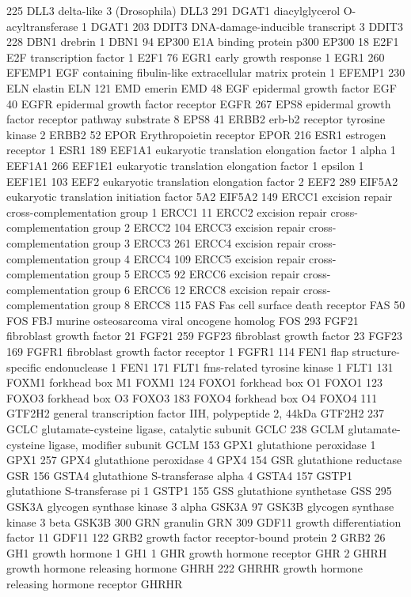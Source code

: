 225	DLL3	delta-like 3 (Drosophila)	DLL3
291	DGAT1	diacylglycerol O-acyltransferase 1	DGAT1
203	DDIT3	DNA-damage-inducible transcript 3	DDIT3
228	DBN1	drebrin 1	DBN1
94	EP300	E1A binding protein p300	EP300
18	E2F1	E2F transcription factor 1	E2F1
76	EGR1	early growth response 1	EGR1
260	EFEMP1	EGF containing fibulin-like extracellular matrix protein 1	EFEMP1
230	ELN	elastin	ELN
121	EMD	emerin	EMD
48	EGF	epidermal growth factor	EGF
40	EGFR	epidermal growth factor receptor	EGFR
267	EPS8	epidermal growth factor receptor pathway substrate 8	EPS8
41	ERBB2	erb-b2 receptor tyrosine kinase 2	ERBB2
52	EPOR	Erythropoietin receptor	EPOR
216	ESR1	estrogen receptor 1	ESR1
189	EEF1A1	eukaryotic translation elongation factor 1 alpha 1	EEF1A1
266	EEF1E1	eukaryotic translation elongation factor 1 epsilon 1	EEF1E1
103	EEF2	eukaryotic translation elongation factor 2	EEF2
289	EIF5A2	eukaryotic translation initiation factor 5A2	EIF5A2
149	ERCC1	excision repair cross-complementation group 1	ERCC1
11	ERCC2	excision repair cross-complementation group 2	ERCC2
104	ERCC3	excision repair cross-complementation group 3	ERCC3
261	ERCC4	excision repair cross-complementation group 4	ERCC4
109	ERCC5	excision repair cross-complementation group 5	ERCC5
92	ERCC6	excision repair cross-complementation group 6	ERCC6
12	ERCC8	excision repair cross-complementation group 8	ERCC8
115	FAS	Fas cell surface death receptor	FAS
50	FOS	FBJ murine osteosarcoma viral oncogene homolog	FOS
293	FGF21	fibroblast growth factor 21	FGF21
259	FGF23	fibroblast growth factor 23	FGF23
169	FGFR1	fibroblast growth factor receptor 1	FGFR1
114	FEN1	flap structure-specific endonuclease 1	FEN1
171	FLT1	fms-related tyrosine kinase 1	FLT1
131	FOXM1	forkhead box M1	FOXM1
124	FOXO1	forkhead box O1	FOXO1
123	FOXO3	forkhead box O3	FOXO3
183	FOXO4	forkhead box O4	FOXO4
111	GTF2H2	general transcription factor IIH, polypeptide 2, 44kDa	GTF2H2
237	GCLC	glutamate-cysteine ligase, catalytic subunit	GCLC
238	GCLM	glutamate-cysteine ligase, modifier subunit	GCLM
153	GPX1	glutathione peroxidase 1	GPX1
257	GPX4	glutathione peroxidase 4	GPX4
154	GSR	glutathione reductase	GSR
156	GSTA4	glutathione S-transferase alpha 4	GSTA4
157	GSTP1	glutathione S-transferase pi 1	GSTP1
155	GSS	glutathione synthetase	GSS
295	GSK3A	glycogen synthase kinase 3 alpha	GSK3A
97	GSK3B	glycogen synthase kinase 3 beta	GSK3B
300	GRN	granulin	GRN
309	GDF11	growth differentiation factor 11	GDF11
122	GRB2	growth factor receptor-bound protein 2	GRB2
26	GH1	growth hormone 1	GH1
1	GHR	growth hormone receptor	GHR
2	GHRH	growth hormone releasing hormone	GHRH
222	GHRHR	growth hormone releasing hormone receptor	GHRHR
